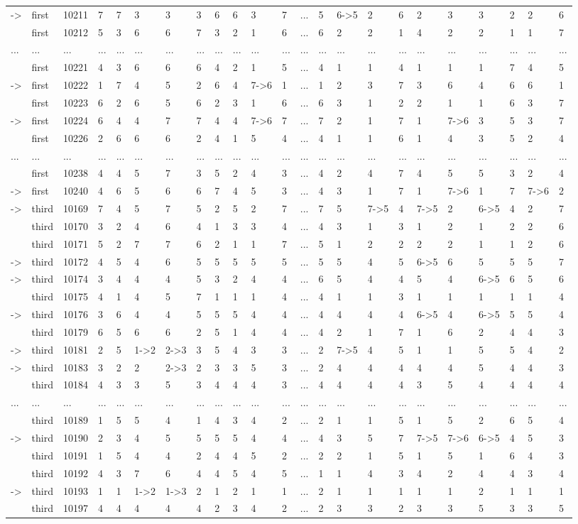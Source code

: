 \begin{landscape}
{\begin{longtable}{lllllllllllllllllllllll}
-\textgreater &first&10211&7&7&3&3&3&6&6&3&7&...&5&6-\textgreater 5&2&6&2&3&3&2&2&6\tabularnewline
&first&10212&5&3&6&6&7&3&2&1&6&...&6&2&2&1&4&2&2&1&1&7\tabularnewline
\newpage
...&...&...&...&...&...&...&...&...&...&...&...&...&...&...&...&...&...&...&...&...&...&...\tabularnewline
&first&10221&4&3&6&6&6&4&2&1&5&...&4&1&1&4&1&1&1&7&4&5\tabularnewline
-\textgreater &first&10222&1&7&4&5&2&6&4&7-\textgreater 6&1&...&1&2&3&7&3&6&4&6&6&1\tabularnewline
&first&10223&6&2&6&5&6&2&3&1&6&...&6&3&1&2&2&1&1&6&3&7\tabularnewline
-\textgreater &first&10224&6&4&4&7&7&4&4&7-\textgreater 6&7&...&7&2&1&7&1&7-\textgreater 6&3&5&3&7\tabularnewline
&first&10226&2&6&6&6&2&4&1&5&4&...&4&1&1&6&1&4&3&5&2&4\tabularnewline
...&...&...&...&...&...&...&...&...&...&...&...&...&...&...&...&...&...&...&...&...&...&...\tabularnewline
&first&10238&4&4&5&7&3&5&2&4&3&...&4&2&4&7&4&5&5&3&2&4\tabularnewline
-\textgreater &first&10240&4&6&5&6&6&7&4&5&3&...&4&3&1&7&1&7-\textgreater 6&1&7&7-\textgreater 6&2\tabularnewline
-\textgreater &third&10169&7&4&5&7&5&2&5&2&7&...&7&5&7-\textgreater 5&4&7-\textgreater 5&2&6-\textgreater 5&4&2&7\tabularnewline
&third&10170&3&2&4&6&4&1&3&3&4&...&4&3&1&3&1&2&1&2&2&6\tabularnewline
&third&10171&5&2&7&7&6&2&1&1&7&...&5&1&2&2&2&2&1&1&2&6\tabularnewline
-\textgreater &third&10172&4&5&4&6&5&5&5&5&5&...&5&5&4&5&6-\textgreater 5&6&5&5&5&7\tabularnewline
-\textgreater &third&10174&3&4&4&4&5&3&2&4&4&...&6&5&4&4&5&4&6-\textgreater 5&6&5&6\tabularnewline
&third&10175&4&1&4&5&7&1&1&1&4&...&4&1&1&3&1&1&1&1&1&4\tabularnewline
-\textgreater &third&10176&3&6&4&4&5&5&5&4&4&...&4&4&4&4&6-\textgreater 5&4&6-\textgreater 5&5&5&4\tabularnewline
&third&10179&6&5&6&6&2&5&1&4&4&...&4&2&1&7&1&6&2&4&4&3\tabularnewline
-\textgreater &third&10181&2&5&1-\textgreater 2&2-\textgreater 3&3&5&4&3&3&...&2&7-\textgreater 5&4&5&1&1&5&5&4&2\tabularnewline
-\textgreater &third&10183&3&2&2&2-\textgreater 3&2&3&3&5&3&...&2&4&4&4&4&4&5&4&4&3\tabularnewline
&third&10184&4&3&3&5&3&4&4&4&3&...&4&4&4&4&3&5&4&4&4&4\tabularnewline
...&...&...&...&...&...&...&...&...&...&...&...&...&...&...&...&...&...&...&...&...&...&...\tabularnewline
&third&10189&1&5&5&4&1&4&3&4&2&...&2&1&1&5&1&5&2&6&5&4\tabularnewline
-\textgreater &third&10190&2&3&4&5&5&5&5&4&4&...&4&3&5&7&7-\textgreater 5&7-\textgreater 6&6-\textgreater 5&4&5&3\tabularnewline
&third&10191&1&5&4&4&2&4&4&5&2&...&2&2&1&5&1&5&1&6&4&3\tabularnewline
&third&10192&4&3&7&6&4&4&5&4&5&...&1&1&4&3&4&2&4&4&3&4\tabularnewline
-\textgreater &third&10193&1&1&1-\textgreater 2&1-\textgreater 3&2&1&2&1&1&...&2&1&1&1&1&1&2&1&1&1\tabularnewline
&third&10197&4&4&4&4&4&2&3&4&2&...&2&3&3&2&3&3&5&3&3&5\tabularnewline

\end{longtable}}
\end{landscape}
